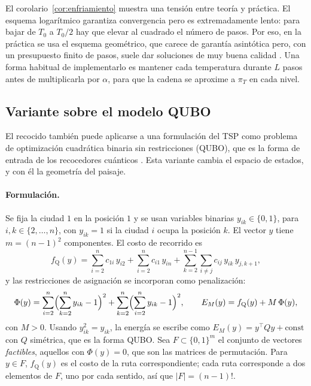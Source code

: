 El corolario~\ref{cor:enfriamiento} muestra una tensión entre teoría y
práctica. El esquema logarítmico garantiza convergencia pero es
extremadamente lento: para bajar de \(T_0\) a \(T_0/2\) hay que elevar
al cuadrado el número de pasos. Por eso, en la práctica se usa el
esquema geométrico, que carece de garantía asintótica pero, con un
presupuesto finito de pasos, suele dar soluciones de muy buena calidad
\citep{delahaye2019}. Una forma habitual de implementarlo es mantener
cada temperatura durante \(L\) pasos antes de multiplicarla por
\(\alpha\), para que la cadena se aproxime a \(\pi_{T}\) en cada
nivel.

\subsection{Variante sobre el modelo QUBO}
\label{subsec:qubo}

El recocido también puede aplicarse a una formulación del TSP como
problema de optimización cuadrática binaria sin restricciones (QUBO),
que es la forma de entrada de los recocedores cuánticos
\citep{lucas2014,glover2022,bochkarev2026}. Esta variante cambia el
espacio de estados, y con él la geometría del paisaje.

\paragraph{Formulación.} Se fija la ciudad \(1\) en la posición \(1\) y
se usan variables binarias \(y_{ik}\in\{0,1\}\), para
\(i,k\in\{2,\ldots,n\}\), con \(y_{ik}=1\) si la ciudad \(i\) ocupa la
posición \(k\). El vector \(y\) tiene \(m=(n-1)^2\) componentes. El
costo de recorrido es
\begin{equation}
\label{eq:costo_qap}
f_{\mathrm Q}(y)=\sum_{i=2}^n c_{1i}\,y_{i2}
+\sum_{i=2}^n c_{i1}\,y_{in}
+\sum_{k=2}^{n-1}\sum_{i\ne j}c_{ij}\,y_{ik}\,y_{j,k+1},
\end{equation}
y las restricciones de asignación se incorporan como penalización:
\begin{equation}
\label{eq:penalizacion}
\Phi(y)=\sum_{i=2}^n\Bigl(\sum_{k=2}^n y_{ik}-1\Bigr)^2
+\sum_{k=2}^n\Bigl(\sum_{i=2}^n y_{ik}-1\Bigr)^2,
\qquad
E_M(y)=f_{\mathrm Q}(y)+M\,\Phi(y),
\end{equation}
con \(M>0\). Usando \(y_{ik}^2=y_{ik}\), la energía se escribe como
\(E_M(y)=y^{\top}Qy+\text{const}\) con \(Q\) simétrica, que es la forma
QUBO. Sea \(F\subset\{0,1\}^m\) el conjunto de vectores
\emph{factibles}, aquellos con \(\Phi(y)=0\), que son las matrices de
permutación. Para \(y\in F\), \(f_{\mathrm Q}(y)\) es el costo de la
ruta correspondiente; cada ruta corresponde a dos elementos de \(F\),
uno por cada sentido, así que \(|F|=(n-1)!\).


